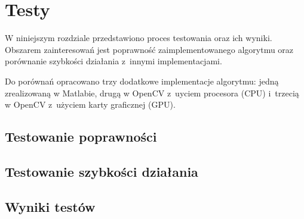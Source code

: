 \chapter{Testy}
\label{cha:testy}

W niniejszym rozdziale przedstawiono proces testowania oraz ich wyniki. Obszarem zainteresowań jest poprawność zaimplementowanego algorytmu oraz porównanie szybkości działania z~innymi implementacjami.

Do porównań opracowano trzy dodatkowe implementacje algorytmu: jedną zrealizowaną w Matlabie, drugą w OpenCV z~uyciem procesora (CPU) i~trzecią w OpenCV z~użyciem karty graficznej (GPU).

\section{Testowanie poprawności}
\label{sec:testPoprawnosc}

\section{Testowanie szybkości działania}
\label{sec:testSzybkosc1}

\section{Wyniki testów}
\label{sec:testWyniki}